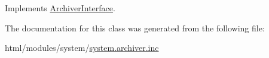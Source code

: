 Implements \hyperlink{interfaceArchiverInterface_adf87dd4d31b2af7c9a90617436683edc}{ArchiverInterface}.

The documentation for this class was generated from the following file:\begin{DoxyCompactItemize}
\item 
html/modules/system/\hyperlink{system_8archiver_8inc}{system.archiver.inc}\end{DoxyCompactItemize}
